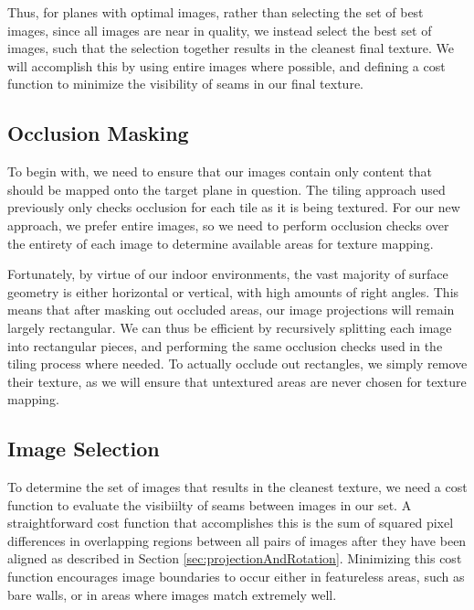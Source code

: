\documentclass[10pt,twocolumn,letterpaper]{article}
\begin{document}
Thus, for planes with optimal images, rather than selecting the set of
best images, since all images are near in quality, we instead select
the best set of images, such that the selection together results in
the cleanest final texture. We will accomplish this by using entire
images where possible, and defining a cost function to minimize the
visibility of seams in our final texture.

\subsection{Occlusion Masking}
\label{sec:occlusionMasking}
To begin with, we need to ensure that our images contain only content
that should be mapped onto the target plane in question. The tiling
approach used previously only checks occlusion for each tile as it is
being textured. For our new approach, we prefer entire images, so we need
to perform occlusion checks over the entirety of each image to
determine available areas for texture mapping.

Fortunately, by virtue of our indoor environments, the vast majority
of surface geometry is either horizontal or vertical, with high
amounts of right angles. This means that after masking out occluded
areas, our image projections will remain largely rectangular. We can
thus be efficient by recursively splitting each image into rectangular
pieces, and performing the same occlusion checks used in the tiling
process where needed. To actually occlude out rectangles, we simply
remove their texture, as we will ensure that untextured areas are
never chosen for texture mapping.

\subsection{Image Selection}
\label{sec:imageSelection}
To determine the set of images that results in the cleanest texture,
we need a cost function to evaluate the visibiilty of seams between
images in our set. A straightforward cost function that accomplishes
this is the sum of squared pixel differences in overlapping regions
between all pairs of images after they have been aligned as described
in Section \ref{sec:projectionAndRotation}. Minimizing this cost
function encourages image boundaries to occur either in featureless
areas, such as bare walls, or in areas where images match extremely
well.
\end{document}

